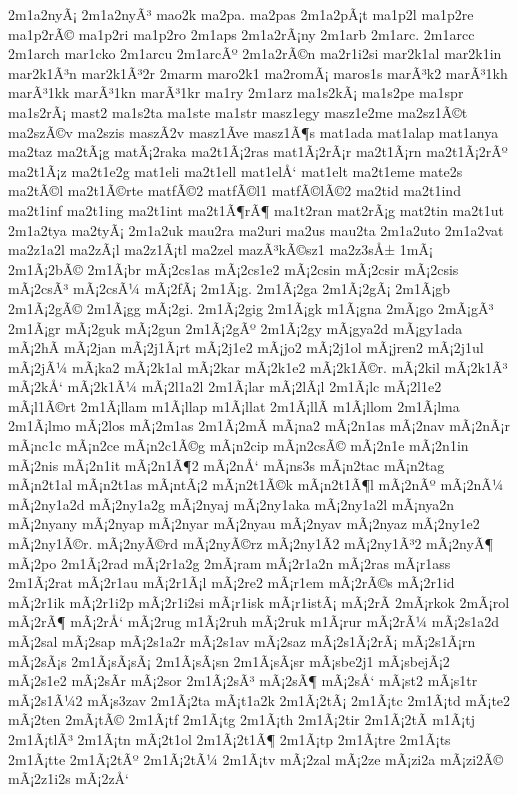 {2m1a2nyÃ¡
2m1a2nyÃ³
mao2k
ma2pa.
ma2pas
2m1a2pÃ¡t
ma1p2l
ma1p2re
ma1p2rÃ©
ma1p2ri
ma1p2ro
2m1aps
2m1a2rÃ¡ny
2m1arb
2m1arc.
2m1arcc
2m1arch
mar1cko
2m1arcu
2m1arcÃº
2m1a2rÃ©n
ma2r1i2si
mar2k1al
mar2k1in
mar2k1Ã³n
mar2k1Ã³2r
2marm
maro2k1
ma2romÃ¡
maros1s
marÃ³k2
marÃ³1kh
marÃ³1kk
marÃ³1kn
marÃ³1kr
ma1ry
2m1arz
ma1s2kÃ¡
ma1s2pe
ma1spr
ma1s2rÃ¡
mast2
ma1s2ta
ma1ste
ma1str
masz1egy
masz1e2me
ma2sz1Ã©t
ma2szÃ©v
ma2szis
maszÃ­2v
masz1Ã­ve
masz1Ã¶s
mat1ada
mat1alap
mat1anya
ma2taz
ma2tÃ¡g
matÃ¡2raka
ma2t1Ã¡2ras
mat1Ã¡2rÃ¡r
ma2t1Ã¡rn
ma2t1Ã¡2rÃº
ma2t1Ã¡z
ma2t1e2g
mat1eli
ma2t1ell
mat1elÅ‘
mat1elt
ma2t1eme
mate2s
ma2tÃ©l
ma2t1Ã©rte
matfÃ©2
matfÃ©l1
matfÃ©lÃ©2
ma2tid
ma2t1ind
ma2t1inf
ma2t1ing
ma2t1int
ma2t1Ã¶rÃ¶
ma1t2ran
mat2rÃ¡g
mat2tin
ma2t1ut
2m1a2tya
ma2tyÃ¡
2m1a2uk
mau2ra
ma2uri
ma2us
mau2ta
2m1a2uto
2m1a2vat
ma2z1a2l
ma2zÃ¡l
ma2z1Ã¡tl
ma2zel
mazÃ³kÃ©sz1
ma2z3sÅ±
1mÃ¡
2m1Ã¡2bÃ©
2m1Ã¡br
mÃ¡2cs1as
mÃ¡2cs1e2
mÃ¡2csin
mÃ¡2csir
mÃ¡2csis
mÃ¡2csÃ³
mÃ¡2csÃ¼
mÃ¡2fÃ¡
2m1Ã¡g.
2m1Ã¡2ga
2m1Ã¡2gÃ¡
2m1Ã¡gb
2m1Ã¡2gÃ©
2m1Ã¡gg
mÃ¡2gi.
2m1Ã¡2gig
2m1Ã¡gk
m1Ã¡gna
2mÃ¡go
2mÃ¡gÃ³
2m1Ã¡gr
mÃ¡2guk
mÃ¡2gun
2m1Ã¡2gÃº
2m1Ã¡2gy
mÃ¡gya2d
mÃ¡gy1ada
mÃ¡2hÃ­
mÃ¡2jan
mÃ¡2j1Ã¡rt
mÃ¡2j1e2
mÃ¡jo2
mÃ¡2j1ol
mÃ¡jren2
mÃ¡2j1ul
mÃ¡2jÃ¼
mÃ¡ka2
mÃ¡2k1al
mÃ¡2kar
mÃ¡2k1e2
mÃ¡2k1Ã©r.
mÃ¡2kil
mÃ¡2k1Ã³
mÃ¡2kÅ‘
mÃ¡2k1Ã¼
mÃ¡2l1a2l
2m1Ã¡lar
mÃ¡2lÃ¡l
2m1Ã¡lc
mÃ¡2l1e2
mÃ¡l1Ã©rt
2m1Ã¡llam
m1Ã¡llap
m1Ã¡llat
2m1Ã¡llÃ­
m1Ã¡llom
2m1Ã¡lma
2m1Ã¡lmo
mÃ¡2los
mÃ¡2m1as
2m1Ã¡2mÃ­
mÃ¡na2
mÃ¡2n1as
mÃ¡2nav
mÃ¡2nÃ¡r
mÃ¡nc1c
mÃ¡n2ce
mÃ¡n2c1Ã©g
mÃ¡n2cip
mÃ¡n2csÃ©
mÃ¡2n1e
mÃ¡2n1in
mÃ¡2nis
mÃ¡2n1it
mÃ¡2n1Ã¶2
mÃ¡2nÅ‘
mÃ¡ns3s
mÃ¡n2tac
mÃ¡n2tag
mÃ¡n2t1al
mÃ¡n2t1as
mÃ¡ntÃ¡2
mÃ¡n2t1Ã©k
mÃ¡n2t1Ã¶l
mÃ¡2nÃº
mÃ¡2nÃ¼
mÃ¡2ny1a2d
mÃ¡2ny1a2g
mÃ¡2nyaj
mÃ¡2ny1aka
mÃ¡2ny1a2l
mÃ¡nya2n
mÃ¡2nyany
mÃ¡2nyap
mÃ¡2nyar
mÃ¡2nyau
mÃ¡2nyav
mÃ¡2nyaz
mÃ¡2ny1e2
mÃ¡2ny1Ã©r.
mÃ¡2nyÃ©rd
mÃ¡2nyÃ©rz
mÃ¡2ny1Ã­2
mÃ¡2ny1Ã³2
mÃ¡2nyÃ¶
mÃ¡2po
2m1Ã¡2rad
mÃ¡2r1a2g
2mÃ¡ram
mÃ¡2r1a2n
mÃ¡2ras
mÃ¡r1ass
2m1Ã¡2rat
mÃ¡2r1au
mÃ¡2r1Ã¡l
mÃ¡2re2
mÃ¡r1em
mÃ¡2rÃ©s
mÃ¡2r1id
mÃ¡2r1ik
mÃ¡2r1i2p
mÃ¡2r1i2si
mÃ¡r1isk
mÃ¡r1istÃ¡
mÃ¡2rÃ­
2mÃ¡rkok
2mÃ¡rol
mÃ¡2rÃ¶
mÃ¡2rÅ‘
mÃ¡2rug
m1Ã¡2ruh
mÃ¡2ruk
m1Ã¡rur
mÃ¡2rÃ¼
mÃ¡2s1a2d
mÃ¡2sal
mÃ¡2sap
mÃ¡2s1a2r
mÃ¡2s1av
mÃ¡2saz
mÃ¡2s1Ã¡2rÃ¡
mÃ¡2s1Ã¡rn
mÃ¡2sÃ¡s
2m1Ã¡sÃ¡sÃ¡
2m1Ã¡sÃ¡sn
2m1Ã¡sÃ¡sr
mÃ¡sbe2j1
mÃ¡sbejÃ¡2
mÃ¡2s1e2
mÃ¡2sÃ­r
mÃ¡2sor
2m1Ã¡2sÃ³
mÃ¡2sÃ¶
mÃ¡2sÅ‘
mÃ¡st2
mÃ¡s1tr
mÃ¡2s1Ã¼2
mÃ¡s3zav
2m1Ã¡2ta
mÃ¡t1a2k
2m1Ã¡2tÃ¡
2m1Ã¡tc
2m1Ã¡td
mÃ¡te2
mÃ¡2ten
2mÃ¡tÃ©
2m1Ã¡tf
2m1Ã¡tg
2m1Ã¡th
2m1Ã¡2tir
2m1Ã¡2tÃ­
m1Ã¡tj
2m1Ã¡tlÃ³
2m1Ã¡tn
mÃ¡2t1ol
2m1Ã¡2t1Ã¶
2m1Ã¡tp
2m1Ã¡tre
2m1Ã¡ts
2m1Ã¡tte
2m1Ã¡2tÃº
2m1Ã¡2tÃ¼
2m1Ã¡tv
mÃ¡2zal
mÃ¡2ze
mÃ¡zi2a
mÃ¡zi2Ã©
mÃ¡2z1i2s
mÃ¡2zÅ‘
}
